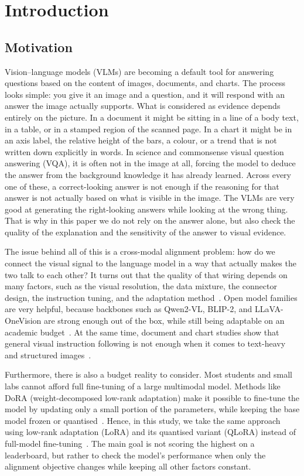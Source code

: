 \chapter{Introduction}
\section{Motivation}
Vision--language models (VLMs) are becoming a default tool for answering questions based on the content of images, documents, and charts.
The process looks simple: you give it an image and a question, and it will respond with an answer the image actually supports.
What is considered as evidence depends entirely on the picture. 
In a document it might be sitting in a line of a body text, in a table, or in a stamped region of the scanned page.
In a chart it might be in an axis label, the relative height of the bars, a colour, or a trend that is not written down explicitly in words.
In science and commonsense visual question answering (VQA), it is often not in the image at all, forcing the model to deduce the answer from the background knowledge it has already learned.
Across every one of these, a correct-looking answer is not enough if the reasoning for that answer is not actually based on what is visible in the image.
The VLMs are very good at generating the right-looking answers while looking at the wrong thing.
That is why in this paper we do not rely on the answer alone, but also check the quality of the explanation and the sensitivity of the answer to visual evidence.

The issue behind all of this is a cross-modal alignment problem: how do we connect the visual signal to the language model in a way that actually makes the two talk to each other?
It turns out that the quality of that wiring depends on many factors, such as the visual resolution, the data mixture, the connector design, the instruction tuning, and the adaptation method~\cite{laurencon2024whatmatters,zhang2025mm15,deitke2025molmo}.
Open model families are very helpful, because backbones such as Qwen2-VL, BLIP-2, and LLaVA-OneVision are strong enough out of the box, while still being adaptable on an academic budget~\cite{wang2024qwen2vl,li2023blip2,li2025llavaonevision}.
At the same time, document and chart studies show that general visual instruction following is not enough when it comes to text-heavy and structured images~\cite{fu2025textrichsurvey,wang2024docllm,masry2024chartinstruct,masry2025chartgemma}.

Furthermore, there is also a budget reality to consider.
Most students and small labs cannot afford full fine-tuning of a large multimodal model.
Methods like DoRA (weight-decomposed low-rank adaptation) make it possible to fine-tune the model by updating only a small portion of the parameters, while keeping the base model frozen or quantised~\cite{liu2024dora}.
Hence, in this study, we take the same approach using low-rank adaptation (LoRA) and its quantised variant (QLoRA) instead of full-model fine-tuning~\cite{hu2022lora,dettmers2023qlora}.
The main goal is not scoring the highest on a leaderboard, but rather to check the model's performance when only the alignment objective changes while keeping all other factors constant.

